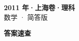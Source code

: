\documentclass[zihao=-4, a4paper]{ctexart}
\begin{document}
\begin{center}
  {\Large\bfseries 2011 年·上海卷·理科}\\[4pt]
  {\large 数学 · 简答版}
\end{center}
\medskip
{}

\clearpage
{}
\begin{center}{\Large\bfseries 答案速查}\end{center}
\medskip

\end{document}
